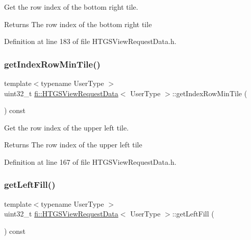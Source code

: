 Get the row index of the bottom right tile. 

\begin{DoxyReturn}{Returns}
The row index of the bottom right tile 
\end{DoxyReturn}


Definition at line 183 of file H\+T\+G\+S\+View\+Request\+Data.\+h.

\mbox{\label{classfi_1_1HTGSViewRequestData_a931645cb254aff9dd249fb9a683f17c9}} 
\subsubsection{\texorpdfstring{get\+Index\+Row\+Min\+Tile()}{getIndexRowMinTile()}}
{\footnotesize\ttfamily template$<$typename User\+Type $>$ \\
uint32\+\_\+t \hyperlink{classfi_1_1HTGSViewRequestData}{fi\+::\+H\+T\+G\+S\+View\+Request\+Data}$<$ User\+Type $>$\+::get\+Index\+Row\+Min\+Tile (\begin{DoxyParamCaption}{ }\end{DoxyParamCaption}) const\hspace{0.3cm}{\ttfamily [inline]}}



Get the row index of the upper left tile. 

\begin{DoxyReturn}{Returns}
The row index of the upper left tile 
\end{DoxyReturn}


Definition at line 167 of file H\+T\+G\+S\+View\+Request\+Data.\+h.

\mbox{\label{classfi_1_1HTGSViewRequestData_a08d848986e08b523280c8c8b69b6b49d}} 
\subsubsection{\texorpdfstring{get\+Left\+Fill()}{getLeftFill()}}
{\footnotesize\ttfamily template$<$typename User\+Type $>$ \\
uint32\+\_\+t \hyperlink{classfi_1_1HTGSViewRequestData}{fi\+::\+H\+T\+G\+S\+View\+Request\+Data}$<$ User\+Type $>$\+::get\+Left\+Fill (\begin{DoxyParamCaption}{ }\end{DoxyParamCaption}) const\hspace{0.3cm}{\ttfamily [inline]}}



